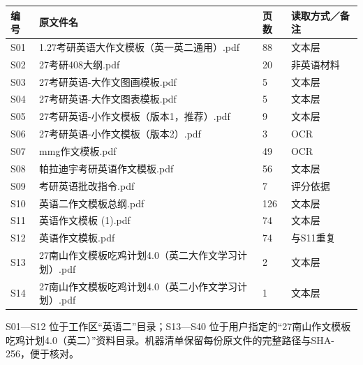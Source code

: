 \documentclass[11pt,a4paper,fontset=macnew]{ctexart}
\begin{document}
\clearpage\par\vspace{4pt}{\bfseries 原文件索引 1—14}\par\nopagebreak
{\small
\begin{longtable}{L{13mm}L{104mm}L{11mm}L{25mm}}\toprule
\textbf{编号} & \textbf{原文件名} & \textbf{页数} & \textbf{读取方式／备注}\\\midrule\endhead
S01 & 1.27考研英语大作文模板（英一英二通用）.pdf & 88 & 文本层\\
S02 & 27考研408大纲.pdf & 20 & 非英语材料\\
S03 & 27考研英语-大作文图画模板.pdf & 5 & 文本层\\
S04 & 27考研英语-大作文图表模板.pdf & 5 & 文本层\\
S05 & 27考研英语-小作文模板（版本1，推荐）.pdf & 9 & 文本层\\
S06 & 27考研英语-小作文模板（版本2）.pdf & 3 & OCR\\
S07 & mmg作文模板.pdf & 49 & OCR\\
S08 & 帕拉迪宇考研英语作文模板.pdf & 56 & 文本层\\
S09 & 考研英语批改指令.pdf & 7 & 评分依据\\
S10 & 英语二作文模板总纲.pdf & 126 & 文本层\\
S11 & 英语作文模板 (1).pdf & 74 & 文本层\\
S12 & 英语作文模板.pdf & 74 & 与S11重复\\
S13 & 27南山作文模板吃鸡计划4.0（英二大作文学习计划）.pdf & 2 & 文本层\\
S14 & 27南山作文模板吃鸡计划4.0（英二小作文学习计划）.pdf & 1 & 文本层\\
\bottomrule\end{longtable}
}
S01—S12 位于工作区“英语二”目录；S13—S40 位于用户指定的“27南山作文模板吃鸡计划4.0（英二）”资料目录。机器清单保留每份原文件的完整路径与SHA-256，便于核对。
\end{document}
